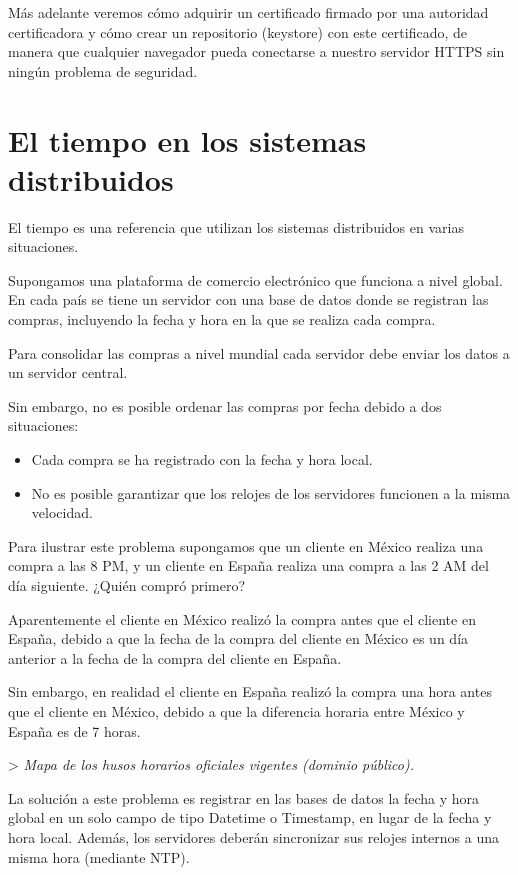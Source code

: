 \documentclass[11pt,a4paper,oneside]{book}
\begin{document}
Más adelante veremos cómo adquirir un certificado firmado por una autoridad certificadora y cómo crear un repositorio (keystore) con este certificado, de manera que cualquier navegador pueda conectarse a nuestro servidor HTTPS sin ningún problema de seguridad.

\chapter{El tiempo en los sistemas distribuidos}

El tiempo es una referencia que utilizan los sistemas distribuidos en varias situaciones.

Supongamos una plataforma de comercio electrónico que funciona a nivel global. En cada país se tiene un servidor con una base de datos donde se registran las compras, incluyendo la fecha y hora en la que se realiza cada compra.

Para consolidar las compras a nivel mundial cada servidor debe enviar los datos a un servidor central.

Sin embargo, no es posible ordenar las compras por fecha debido a dos situaciones:

\begin{itemize}

\item Cada compra se ha registrado con la fecha y hora local.

\item No es posible garantizar que los relojes de los servidores funcionen a la misma velocidad.

\end{itemize}

Para ilustrar este problema supongamos que un cliente en México realiza una compra a las 8 PM, y un cliente en España realiza una compra a las 2 AM del día siguiente. ¿Quién compró primero?

Aparentemente el cliente en México realizó la compra antes que el cliente en España, debido a que la fecha de la compra del cliente en México es un día anterior a la fecha de la compra del cliente en España.

Sin embargo, en realidad el cliente en España realizó la compra una hora antes que el cliente en México, debido a que la diferencia horaria entre México y España es de 7 horas.

> \emph{Mapa de los husos horarios oficiales vigentes (dominio público).} 

La solución a este problema es registrar en las bases de datos la fecha y hora global en un solo campo de tipo Datetime o Timestamp, en lugar de la fecha y hora local. Además, los servidores deberán sincronizar sus relojes internos a una misma hora (mediante NTP).
\end{document}
